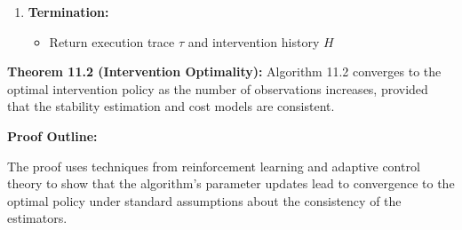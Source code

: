 \documentclass[
]{article}
\providecommand{\tightlist}{%
  \setlength{\itemsep}{0pt}\setlength{\parskip}{0pt}}
\begin{document}
\begin{enumerate}
\begin{itemize}
\begin{itemize}
\begin{itemize}
        \begin{itemize}
        \tightlist
        \item
          Select intervention \(I\) from available interventions
          \(\mathcal{I}\)
        \item
          Apply intervention:
          \(s_{\text{current}} = I(s_{\text{current}})\)
        \item
          Add intervention record to \(H\)
        \end{itemize}
      \item
        Else:

        \begin{itemize}
        \tightlist
        \item
          Set \(s_{\text{current}} = s_{\text{next}}\)
        \end{itemize}
      \end{itemize}
    \item
      \textbf{Adaptive Parameter Update:}

      \begin{itemize}
      \tightlist
      \item
        Update \(\theta\) and cost models based on intervention history
        \(H\)
      \item
        Adjust observation window \(w\) based on pattern classification
      \end{itemize}
    \end{itemize}
  \end{itemize}
\item
  \textbf{Termination:}

  \begin{itemize}
  \tightlist
  \item
    Return execution trace \(\tau\) and intervention history \(H\)
  \end{itemize}
\end{enumerate}

\textbf{Theorem 11.2 (Intervention Optimality):} Algorithm 11.2
converges to the optimal intervention policy as the number of
observations increases, provided that the stability estimation and cost
models are consistent.

\textbf{Proof Outline:}

The proof uses techniques from reinforcement learning and adaptive
control theory to show that the algorithm's parameter updates lead to
convergence to the optimal policy under standard assumptions about the
consistency of the estimators.
\end{document}
